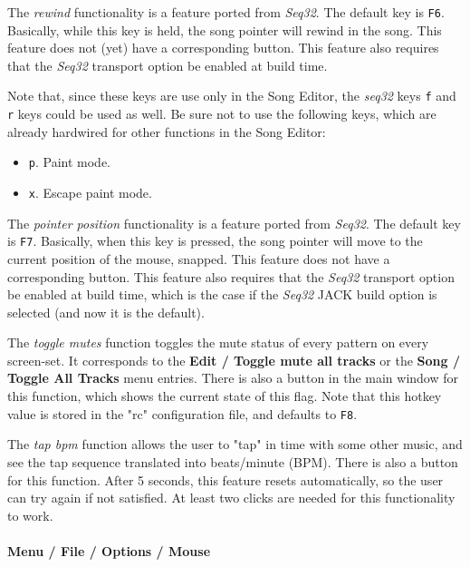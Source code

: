    The \textsl{rewind} functionality is a feature ported
   from \textsl{Seq32}.
   The default key is \texttt{F6}.
   Basically, while this key is held, the song pointer will rewind in
   the song.
   This feature does not (yet) have a corresponding button.
   This feature also requires that the \textsl{Seq32} transport option be
   enabled at build time.

   Note that, since these keys are use only in the Song Editor,
   the \textsl{seq32} keys \texttt{f} and \texttt{r} keys could be
   used as well.  Be sure not to use the following keys, which are already
   hardwired for other functions in the Song Editor:

   \begin{itemize}
      \item \texttt{p}.  Paint mode.
      \item \texttt{x}.  Escape paint mode.
   \end{itemize}


   The \textsl{pointer position} functionality is a feature ported
   from \textsl{Seq32}.
   The default key is \texttt{F7}.
   Basically, when this key is pressed, the song pointer will move to the
   current position of the mouse, snapped.
   This feature does not have a corresponding button.
   This feature also requires that the \textsl{Seq32} transport option be
   enabled at build time, which is the case if the \textsl{Seq32} JACK build
   option is selected (and now it is the default).

   The \textsl{toggle mutes} function toggles the mute status of every
   pattern on every screen-set.  It corresponds to the
   \textbf{Edit / Toggle mute all tracks} or the 
   \textbf{Song / Toggle All Tracks}
   menu entries.  There is also a button in the main window for this function,
   which shows the current state of this flag.  Note that this
   hotkey value is stored in the "rc" configuration file, and
   defaults to \texttt{F8}.

   The \textsl{tap bpm} function allows the user to "tap" in time with some
   other music, and see the tap sequence translated into beats/minute (BPM).
   There is also a button for this function.
   After 5 seconds, this feature resets automatically, so the user can try
   again if not satisfied.  At least two clicks are needed for this
   functionality to work.

\paragraph{Menu / File / Options / Mouse }
\label{paragraph:seq64_menu_file_options_mouse}

